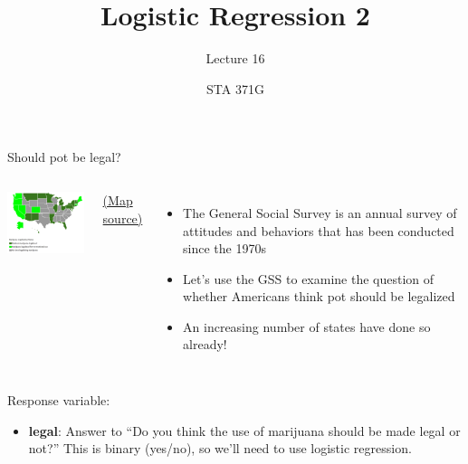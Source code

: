 \documentclass{beamer}\usepackage[]{graphicx}\usepackage[]{color}
\title{Logistic Regression 2}
\subtitle{Lecture 16}
\author{STA 371G}
\begin{document}
  
  

  \frame{\maketitle}



  \begin{darkframes}
    \begin{frame}{Should pot be legal?}
      \begin{columns}[onlytextwidth]
          \includegraphics[width=2in]{map}

          \begin{center}
            \fontsize{8}{8} 
            \href{http://www.governing.com/gov-data/state-marijuana-laws-map-medical-recreational.html}{(Map source)}
          \end{center}
        
          \begin{itemize}
            \item The General Social Survey is an annual survey of attitudes and behaviors that has been conducted since the 1970s
            \item Let's use the GSS to examine the question of whether Americans think pot should be legalized
            \item An increasing number of states have done so already!
          \end{itemize}
      \end{columns}
    \end{frame}

    \begin{frame}
      Response variable:
      \begin{itemize}
        \item \textbf{legal}: Answer to ``Do you think the use of marijuana should be made legal or not?'' \pause\alert{This is binary (yes/no), so we'll need to use logistic regression.}
      \end{itemize}


\end{frame}
\end{darkframes}
\end{document}
